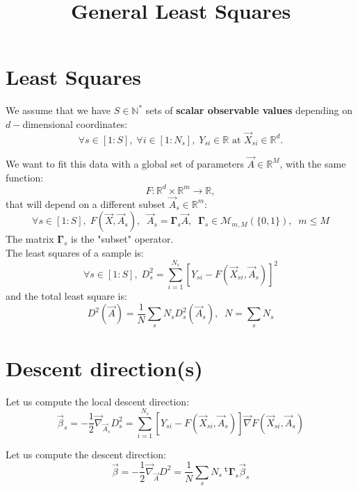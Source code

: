 \documentclass[aps,12pt]{revtex4}
\newcommand{\trn}[1]{~^{\mathtt{t}}{#1}}
\begin{document}
\title{General Least Squares}
\maketitle

\section{Least Squares}
We assume that we have $S\in \mathbb{N}^*$ sets of \textbf{scalar observable values} depending on $d-$dimensional coordinates:
\begin{equation}
	\forall s \in [1:S], \; \forall i \in [1:N_s], \; Y_{si} \in \mathbb{R} \text{ at } \vec{X}_{si} \in \mathbb{R}^d.
\end{equation}

We want to fit this data with a global set of parameters $\vec{A}\in \mathbb{R}^M$,
with the same function: 
\begin{equation}
F : \mathbb{R}^d \times \mathbb{R}^m \rightarrow \mathbb{R},
\end{equation}
that will depend on a different subset $\vec{A}_s\in\mathbb{R}^m$:
\begin{equation}
	\forall s \in [1:S], \; F(\vec{X},\vec{A}_s), \;\; \vec{A}_s = \bm{\Gamma}_s \vec{A}, \;\; \bm{\Gamma}_s \in \mathcal{M}_{m,M}(\{0,1\}),\;\;m\leq M
\end{equation}
The matrix $\bm{\Gamma}_s$ is the "subset" operator.\\
The least squares of a sample is:
\begin{equation}
		\forall s \in [1:S], \; D^2_s = \sum_{i=1}^{N_s} \left[ Y_{si} - F(\vec{X}_{si},\vec{A}_s) \right]^2
\end{equation}
and the total least square is:
\begin{equation}
	D^2(\vec{A}) = \frac{1}{N}\sum_s N_s D^2_s (\vec{A}_s ),\;\; N=\sum_s N_s
\end{equation}

\section{Descent direction(s)}
Let us compute the local descent direction:
\begin{equation}
	\vec{\beta}_s = - \dfrac{1}{2} \vec{\nabla}_{\vec{A}_s} D^2_s = \sum_{i=1}^{N_s} \left[ Y_{si} - F(\vec{X}_{si},\vec{A}_s) \right] \vec{\nabla} F(\vec{X}_{si},\vec{A}_s)
\end{equation}

Let us compute the descent direction:
\begin{equation}
 	\vec{\beta}    = - \dfrac{1}{2}\vec{\nabla}_{\vec{A}} D^2 
	 =  \dfrac{1}{N} \sum_s N_s \trn{\bm{\Gamma}}_s \vec{\beta}_s
\end{equation}
\end{document}
